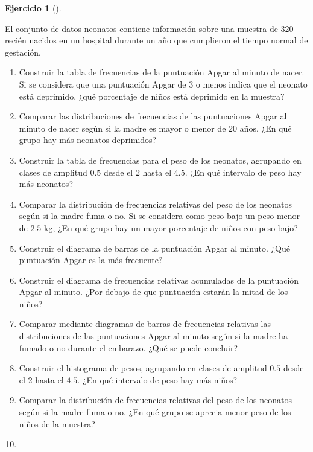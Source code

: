 \documentclass[
  a4paper,
]{scrreport}
\theoremstyle{definition}
\newtheorem{exercise}{Ejercicio}[chapter]
\theoremstyle{remark}
\begin{document}
\begin{exercise}[]\protect\hypertarget{exr-frecuencias-graficos-neonatos}{}\label{exr-frecuencias-graficos-neonatos}

El conjunto de datos \href{datos/neonatos.csv}{neonatos} contiene
información sobre una muestra de 320 recién nacidos en un hospital
durante un año que cumplieron el tiempo normal de gestación.

\begin{enumerate}
\def\labelenumi{\alph{enumi}.}
\item
  Construir la tabla de frecuencias de la puntuación Apgar al minuto de
  nacer. Si se considera que una puntuación Apgar de 3 o menos indica
  que el neonato está deprimido, ¿qué porcentaje de niños está deprimido
  en la muestra?
\item
  Comparar las distribuciones de frecuencias de las puntuaciones Apgar
  al minuto de nacer según si la madre es mayor o menor de 20 años. ¿En
  qué grupo hay más neonatos deprimidos?
\item
  Construir la tabla de frecuencias para el peso de los neonatos,
  agrupando en clases de amplitud \(0.5\) desde el \(2\) hasta el
  \(4.5\). ¿En qué intervalo de peso hay más neonatos?
\item
  Comparar la distribución de frecuencias relativas del peso de los
  neonatos según si la madre fuma o no. Si se considera como peso bajo
  un peso menor de \(2.5\) kg, ¿En qué grupo hay un mayor porcentaje de
  niños con peso bajo?
\item
  Construir el diagrama de barras de la puntuación Apgar al minuto. ¿Qué
  puntuación Apgar es la más frecuente?
\item
  Construir el diagrama de frecuencias relativas acumuladas de la
  puntuación Apgar al minuto. ¿Por debajo de que puntuación estarán la
  mitad de los niños?
\item
  Comparar mediante diagramas de barras de frecuencias relativas las
  distribuciones de las puntuaciones Apgar al minuto según si la madre
  ha fumado o no durante el embarazo. ¿Qué se puede concluir?
\item
  Construir el histograma de pesos, agrupando en clases de amplitud
  \(0.5\) desde el \(2\) hasta el \(4.5\). ¿En qué intervalo de peso hay
  más niños?
\item
  Comparar la distribución de frecuencias relativas del peso de los
  neonatos según si la madre fuma o no. ¿En qué grupo se aprecia menor
  peso de los niños de la muestra?
\item

\end{enumerate}
\end{exercise}
\end{document}
